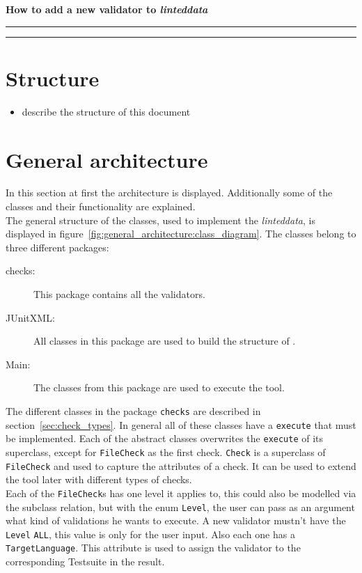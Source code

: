 \documentclass[11pt,a4paper]{article}
\newcommand{\function}[1]{\texttt{#1}}
\newcommand{\class}[1]{\texttt{#1}}
\newcommand{\enum}[1]{\texttt{#1}}
\newcommand{\package}[1]{\texttt{#1}}
\newcommand{\toolname}{\textit{linteddata}}
\begin{document}
\begin{center}
\begin{LARGE}
\textbf{How to add a new validator to \toolname}
\end{LARGE}
\end{center}
\hrule
\tableofcontents
\bigskip
\hrule
%
\section{Structure}
%
\begin{itemize}
	\item describe the structure of this document
\end{itemize}
%
\section{General architecture}
\label{sec:general_architecture}
%
In this section at first the architecture is displayed. 
Additionally some of the classes and their functionality are explained.  
\\ 
The general structure of the classes, used to implement the \toolname , is displayed in figure~\ref{fig:general_architecture:class_diagram}. 
The classes belong to three different packages: 
\begin{description}
	\item[checks:] This package contains all the validators. 
	\item[JUnitXML:] All classes in this package are used to build the structure of \cite{JUnitXML_ibm}. 
	\item[Main:] The classes from this package are used to execute the tool. 
\end{description}
%
The different classes in the package \package{checks} are described in section~\ref{sec:check_types}. 
In general all of these classes have a \function{execute} that must be implemented. 
Each of the abstract classes overwrites the \function{execute} of its superclass, except for \class{FileCheck} as the first check. 
\class{Check} is a superclass of \class{FileCheck} and used to capture the attributes of a check. 
It can be used to extend the tool later with different types of checks. 
\\
Each of the \class{FileCheck}s has one level it applies to, this could also be modelled via the subclass relation, but with the enum \enum{Level}, the user can pass as an argument what kind of validations he wants to execute. 
A new validator mustn't have the \enum{Level} \enum{ALL}, this value is only for the user input. 
Also each one has a \enum{TargetLanguage}. 
This attribute is used to assign the validator to the corresponding Testsuite in the result. 
\end{document}
